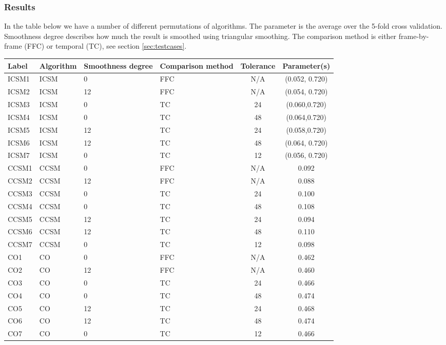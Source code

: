\documentclass[12pt]{article}
\begin{document}
\subsubsection{Results}
%
In the table below we have a number of different permutations of algorithms. The parameter is the average over the 5-fold cross validation. Smoothness degree describes how much the result is smoothed using triangular smoothing. The comparison method is either frame-by-frame (FFC) or temporal (TC), see section \ref{sec:testcases}.
%
\begin{table}
  \begin{tabular}{| l | l | p{2cm} | p{2cm} | c | c | }\hline
    Label & Algorithm & Smoothness degree & Comparison method & Tolerance & Parameter(s)\\\hline
    ICSM1 & ICSM & 0 & FFC & N/A & (0.052, 0.720) \\\hline
    ICSM2 & ICSM & 12 & FFC & N/A & (0.054, 0.720) \\\hline
    ICSM3 & ICSM & 0 & TC & 24 & (0.060,0.720) \\\hline
    ICSM4 & ICSM & 0 & TC & 48 & (0.064,0.720) \\\hline
    ICSM5 & ICSM & 12 & TC & 24 & (0.058,0.720) \\\hline
    ICSM6 & ICSM & 12 & TC & 48 & (0.064, 0.720) \\\hline
    ICSM7 & ICSM & 0 & TC & 12 & (0.056, 0.720) \\\hline\hline

    CCSM1 & CCSM & 0 & FFC & N/A & 0.092 \\\hline
    CCSM2 & CCSM & 12 & FFC & N/A & 0.088 \\\hline
    CCSM3 & CCSM & 0 & TC & 24 & 0.100 \\\hline
    CCSM4 & CCSM & 0 & TC & 48 & 0.108 \\\hline
    CCSM5 & CCSM & 12 & TC & 24 & 0.094 \\\hline
    CCSM6 & CCSM & 12 & TC & 48 & 0.110 \\\hline
    CCSM7 & CCSM & 0 & TC & 12 & 0.098 \\\hline\hline

    CO1 & CO & 0 & FFC & N/A & 0.462 \\\hline
    CO2 & CO & 12 & FFC & N/A & 0.460 \\\hline
    CO3 & CO & 0 & TC & 24 & 0.466 \\\hline
    CO4 & CO & 0 & TC & 48 & 0.474 \\\hline
    CO5 & CO & 12 & TC & 24 & 0.468 \\\hline
    CO6 & CO & 12 & TC & 48 & 0.474 \\\hline
    CO7 & CO & 0 & TC & 12 & 0.466 \\\hline\hline


\end{tabular}
\end{table}
\end{document}
